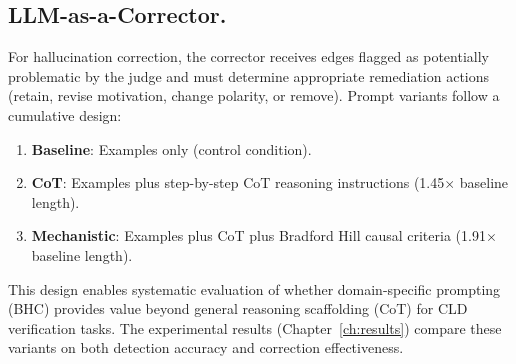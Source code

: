 \subsection{LLM-as-a-Corrector.}
For hallucination correction, the corrector receives edges flagged as potentially problematic by the judge and must determine appropriate remediation actions (retain, revise motivation, change polarity, or remove). Prompt variants follow a cumulative design:
\begin{enumerate}
    \item \textbf{Baseline}: Examples only (control condition).
    \item \textbf{CoT}: Examples plus step-by-step CoT reasoning instructions (1.45$\times$ baseline length).
    \item \textbf{Mechanistic}: Examples plus CoT plus Bradford Hill causal criteria (1.91$\times$ baseline length).
\end{enumerate}

This design enables systematic evaluation of whether domain-specific prompting (BHC) provides value beyond general reasoning scaffolding (CoT) for CLD verification tasks. The experimental results (Chapter~\ref{ch:results}) compare these variants on both detection accuracy and correction effectiveness.











